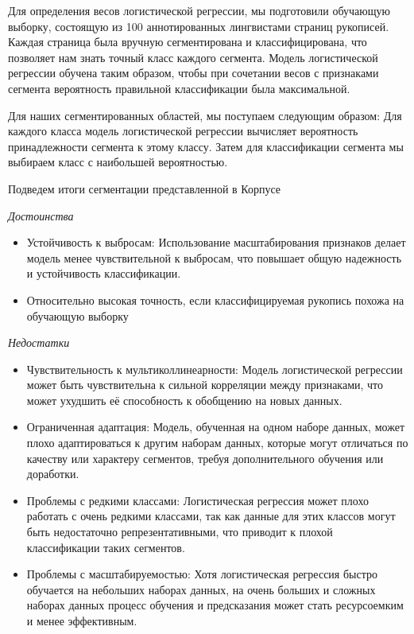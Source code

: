 Для определения весов логистической регрессии, мы подготовили обучающую выборку, состоящую из 100 
аннотированных лингвистами страниц рукописей. Каждая страница была вручную сегментирована и 
классифицирована, что позволяет нам знать точный класс каждого сегмента. Модель логистической регрессии 
обучена таким образом, чтобы при сочетании весов с признаками сегмента вероятность правильной классификации 
была максимальной.

Для наших сегментированных областей, мы поступаем следующим образом:
Для каждого класса модель логистической регрессии вычисляет вероятность принадлежности сегмента 
к этому классу. Затем для классификации сегмента мы выбираем класс с наибольшей вероятностью.

Подведем итоги сегментации представленной в Корпусе


\textit{Достоинства}
	\begin{itemize}
		\item Устойчивость к выбросам: Использование масштабирования признаков делает модель менее чувствительной к выбросам, 
			что повышает общую надежность и устойчивость классификации\cite{MIvaschenko}.
		\item Относительно высокая точность, если классифицируемая рукопись похожа на обучающую выборку
	\end{itemize}


\textit{Недостатки}
	\begin{itemize}
		\item Чувствительность к мультиколлинеарности: Модель логистической регрессии может быть 
			чувствительна к сильной корреляции между признаками, что может ухудшить её способность 
			к обобщению на новых данных\cite{MKurdyumov}.
		\item Ограниченная адаптация: Модель, обученная на одном наборе данных, может плохо адаптироваться 
			к другим наборам данных, которые могут отличаться по качеству или характеру сегментов, 
			требуя дополнительного обучения или доработки.
		\item Проблемы с редкими классами: Логистическая регрессия может плохо работать с очень редкими 
			классами, так как данные для этих классов могут быть недостаточно репрезентативными, 
			что приводит к плохой классификации таких сегментов.
		\item Проблемы с масштабируемостью: Хотя логистическая регрессия быстро обучается на небольших 
			наборах данных, на очень больших и сложных наборах данных процесс обучения и предсказания 
			может стать ресурсоемким и менее эффективным.
	\end{itemize}


